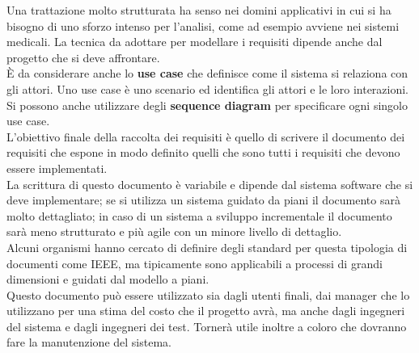 Una trattazione molto strutturata ha senso nei domini applicativi in cui si ha bisogno di uno sforzo intenso per l'analisi, come ad esempio avviene nei sistemi medicali.
La tecnica da adottare per modellare i requisiti dipende anche dal progetto che si deve affrontare.\\
È da considerare anche lo \textbf{use case} che definisce come il sistema si relaziona con gli attori.
Uno use case è uno scenario ed identifica gli attori e le loro interazioni.
Si possono anche utilizzare degli \textbf{sequence diagram} per specificare ogni singolo use case.\\
L'obiettivo finale della raccolta dei requisiti è quello di scrivere il documento dei requisiti che espone in modo definito quelli che sono tutti i requisiti che devono essere implementati.\\
La scrittura di questo documento è variabile e dipende dal sistema software che si deve implementare; se si utilizza un sistema guidato da piani il documento sarà molto dettagliato; in caso di un sistema a sviluppo incrementale il documento sarà meno strutturato e più agile con un minore livello di dettaglio.\\
Alcuni organismi hanno cercato di definire degli standard per questa tipologia di documenti come \acrfull{IEEE}, ma tipicamente sono applicabili a processi di grandi dimensioni e guidati dal modello a piani.\\
Questo documento può essere utilizzato sia dagli utenti finali, dai manager che lo utilizzano per una stima del costo che il progetto avrà, ma anche dagli ingegneri del sistema e dagli ingegneri dei test.
Tornerà utile inoltre a coloro che dovranno fare la manutenzione del sistema.

